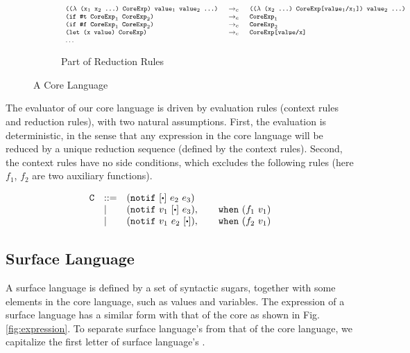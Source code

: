 \begin{figure*}[t]
\begin{subfigure}{0.99\linewidth}
	\[
{\footnotesize
		\begin{array}{lcl}
		\texttt{(($\lambda$~($\mbox{\tt x}_1$~$\mbox{\tt x}_2$~...)~CoreExp)~$\mbox{\tt value}_1$~$\mbox{\tt value}_2$~...)} &~\rightarrow_c~& \texttt{(($\lambda$~($\mbox{\tt x}_2$~...)~CoreExp[$\mbox{\tt value}_1$/$\mbox{\tt x}_1$])~$\mbox{\tt value}_2$~...)}\\

		\texttt{(if~$\mbox{\tt \#t}$~$\mbox{\tt CoreExp}_1$~$\mbox{\tt CoreExp}_2$)}&~\rightarrow_c~& \texttt{$\mbox{\tt CoreExp}_1$}\\
		\texttt{(if~$\mbox{\tt \#f}$~$\mbox{\tt CoreExp}_1$~$\mbox{\tt CoreExp}_2$)}&~\rightarrow_c~& \texttt{$\mbox{\tt CoreExp}_2$}\\
		\texttt{(let~(x~$\mbox{\tt value}$)~CoreExp)}&~\rightarrow_c~&\texttt{CoreExp[\mbox{\tt value}/x]}\\
		\ldots&&
		\end{array}
}
\]
	\caption{Part of Reduction Rules}
\end{subfigure}


\caption{A Core Language}
\label{fig:core}
\end{figure*}

The evaluator of our core language is driven by evaluation rules (context rules and reduction rules), with two natural assumptions. First, the evaluation is deterministic, in the sense that any expression in the core language will be reduced by a unique reduction sequence (defined by the context rules). Second, the context rules have no side conditions, which excludes the following rules (here $f_1$, $f_2$ are two auxiliary functions).

{\footnotesize
\[
\begin{array}{lll}
\m{C}& ::= & (\m{notif}~[\bigcdot]~e_2~e_3)\\
&|& (\m{notif}~v_1~[\bigcdot]~e_3), \qquad \m{when}~(f_1~v_1)\\
&|& (\m{notif}~v_1~e_2~[\bigcdot]), \qquad \m{when}~(f_2~v_1)
\end{array}
\]}


\subsection{Surface Language}
\label{mark:suflang}

A surface language is defined by a set of syntactic sugars, together with some elements in the core language, such as values and variables. The expression of a surface language has a similar form with that of the core as shown in Fig.  \ref{fig:expression}. To separate surface language's  from that of the core language, we capitalize the first letter of surface language's .


